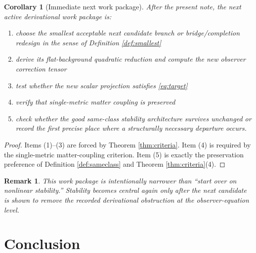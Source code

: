 \documentclass[11pt]{article}
\newtheorem{remark}{Remark}
\newtheorem{corollary}{Corollary}
\begin{document}
\begin{corollary}[Immediate next work package]
\label{cor:agenda}
After the present note, the next active derivational work package is:
\begin{enumerate}
    \item choose the smallest acceptable next candidate branch or bridge/completion redesign in the sense of Definition \ref{def:smallest}
    \item derive its flat-background quadratic reduction and compute the new observer correction tensor
    \item test whether the new scalar projection satisfies \eqref{eq:target}
    \item verify that single-metric matter coupling is preserved
    \item check whether the good same-class stability architecture survives unchanged or record the first precise place where a structurally necessary departure occurs.
\end{enumerate}
\end{corollary}

\begin{proof}
Items (1)--(3) are forced by Theorem \ref{thm:criteria}. Item (4) is required by the single-metric matter-coupling criterion. Item (5) is exactly the preservation preference of Definition \ref{def:sameclass} and Theorem \ref{thm:criteria}(4).
\end{proof}

\begin{remark}
This work package is intentionally narrower than ``start over on nonlinear stability.'' Stability becomes central again only after the next candidate is shown to remove the recorded derivational obstruction at the observer-equation level.
\end{remark}

\section{Conclusion}
\end{document}
